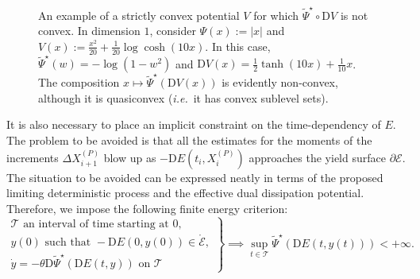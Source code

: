 \documentclass[reqno]{amsart}
\theoremstyle{definition}
\begin{document}
\begin{figure}[t]
	\begin{center}
	  \caption[A convex potential $V$ for which ${\widetilde{\Psi}}^{\star} \circ {\mathrm{D}} V$ is not convex.]{An example of a strictly convex potential $V$ for which ${\widetilde{\Psi}}^{\star} \circ {\mathrm{D}} V$ is not convex.  In dimension $1$, consider $\Psi(x) := | x |$ and ${ V(x) := \tfrac{x^{2}}{20} + \tfrac{1}{20} \log \cosh ( 10 x ) }$.  In this case, ${\widetilde{\Psi}}^{\star}(w) = - \log (1 - w^{2})$ and ${\mathrm{D}} V(x) = \tfrac{1}{2} \tanh (10 x) + \tfrac{1}{10} x$. The composition $x \mapsto {\widetilde{\Psi}}^{\star}({\mathrm{D}} V(x))$ is evidently non-convex, although it is quasiconvex (\emph{i.e.}\ it has convex sublevel sets).}
	  \label{fig:NonConvexEDDP}
	\end{center}
\end{figure}

It is also necessary to place an implicit constraint on the time-dependency of $E$.  The problem to be avoided is that all the estimates for the moments of the increments $\Delta X_{i + 1}^{(P)}$ blow up as $- {\mathrm{D}} E(t_{i}, X_{i}^{(P)})$ approaches the yield surface $\partial {\mathcal{E}}$.  The situation to be avoided can be expressed neatly in terms of the proposed limiting deterministic process and the effective dual dissipation potential.  Therefore, we impose the following finite energy criterion:
\begin{equation}
	\label{eq:MarkovLim-Convex-USC}
	\left.
	\begin{matrix}
		\mathcal{T} \text{ an interval of time starting at } 0, \\
		y(0) \text{ such that } - {\mathrm{D}} E(0, y(0)) \in \mathring{\mathcal{E}}, \\
		\dot{y} = - \theta {\mathrm{D}} {\widetilde{\Psi}}^{\star} ({\mathrm{D}} E(t, y)) \text{ on } \mathcal{T}
	\end{matrix}
	\right\}
	\implies \sup_{t \in \mathcal{T}} {\widetilde{\Psi}}^{\star} ({\mathrm{D}} E(t, y(t))) < + \infty.
\end{equation}
\end{document}
